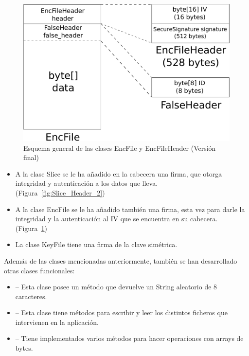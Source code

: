 \begin{figure}[!htb]
  \centering
  \includegraphics[scale=0.4]{Figures/EncFile_Header_2}
  \decoRule
  \caption[EncFile - EncFileHeader (Versión final)]{Esquema general de las clases EncFile y EncFileHeader (Versión final)}
  \label{fig:EncFile_Header_2}
\end{figure}

\begin{itemize}
  \item A la clase Slice se le ha añadido en la cabecera una firma, que otorga
  integridad y autenticación a los datos que lleva.
  (Figura~\ref{fig:Slice_Header_2})

  \item A la clase EncFile se le ha añadido también una firma, esta vez para
  darle la integridad y la autenticación al IV que se encuentra en su cabecera.
  (Figura~\ref{fig:EncFile_Header_2})

  \item La clase KeyFile tiene una firma de la clave simétrica.
\end{itemize}

Además de las clases mencionadas anteriormente, también se han desarrollado
otras clases funcionales:

\begin{itemize}
  \item {} -- Esta clase posee un método que devuelve un
  String aleatorio de 8 caracteres.

  \item {} -- Esta clase tiene métodos para escribir y leer los
  distintos ficheros que intervienen en la aplicación.

  \item {} -- Tiene implementados varios métodos para hacer
  operaciones con arrays de bytes.
\end{itemize}

